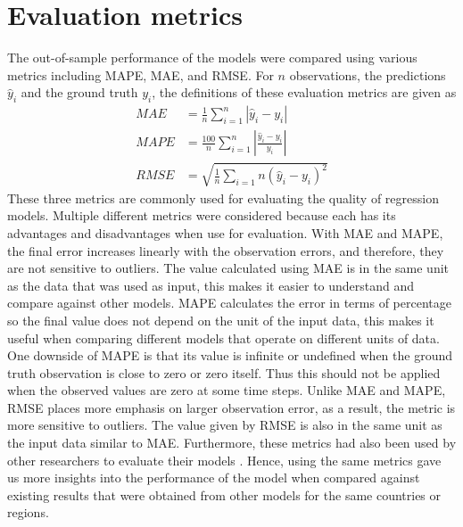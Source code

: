 \section{Evaluation metrics}
\label{sec:methodologies-evaluation-metrics}

The out-of-sample performance of the models were compared using various metrics including \gls{MAPE}, \gls{MAE}, and \gls{RMSE}. For $n$ observations, the predictions $\hat{y}_i$ and the ground truth $y_i$, the definitions of these evaluation metrics are given as
\begin{align*}
    MAE &= \frac{1}{n} \sum_{i=1}^n \left| \hat{y}_i - y_i \right| \\
    MAPE &= \frac{100}{n} \sum_{i=1}^n \left| \frac{\hat{y}_i - y_i}{y_i} \right| \\
    RMSE &= \sqrt{\frac{1}{n} \sum_{i=1}{n} (\hat{y}_i - y_i)^2}
\end{align*}
These three metrics are commonly used for evaluating the quality of regression models.
Multiple different metrics were considered because each has its advantages and disadvantages when use for evaluation.
With \gls{MAE} and \gls{MAPE}, the final error increases linearly with the observation errors, and therefore, they are not sensitive to outliers.
The value calculated using \gls{MAE} is in the same unit as the data that was used as input, this makes it easier to understand and compare against other models.
\gls{MAPE} calculates the error in terms of percentage so the final value does not depend on the unit of the input data, this makes it useful when comparing different models that operate on different units of data.
One downside of \gls{MAPE} is that its value is infinite or undefined when the ground truth observation is close to zero or zero itself.
Thus this should not be applied when the observed values are zero at some time steps.
Unlike \gls{MAE} and \gls{MAPE}, \gls{RMSE} places more emphasis on larger observation error, as a result, the metric is more sensitive to outliers.
The value given by \gls{RMSE} is also in the same unit as the input data similar to \gls{MAE}.
Furthermore, these metrics had also been used by other researchers to evaluate their models \cite{rayEnsembleForecastsCoronavirus2020, ihmecovid-19forecastingteamModelingCOVID19Scenarios2021,arikInterpretableSequenceLearning}.
Hence, using the same metrics gave us more insights into the performance of the model when compared against existing results that were obtained from other models for the same countries or regions.

